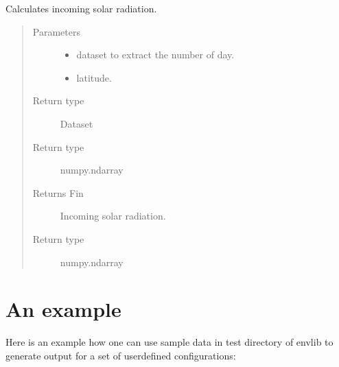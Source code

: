 \documentclass[a4paper,11pt,english]{sphinxmanual}
\begin{document}
\begin{fulllineitems}
\label{\detokenize{modules:envlib.accf.get_Fin}}
Calculates incoming solar radiation.
\begin{quote}\begin{description}
\item[{Parameters}] \leavevmode\begin{itemize}
\item {} 
 \textendash{} dataset to extract the number of day.

\item {} 
 \textendash{} latitude.

\end{itemize}

\item[{Return type}] \leavevmode
Dataset

\item[{Return type}] \leavevmode
numpy.ndarray

\item[{Returns Fin}] \leavevmode
Incoming solar radiation.

\item[{Return type}] \leavevmode
numpy.ndarray

\end{description}\end{quote}

\end{fulllineitems}



\chapter{An example}
\label{\detokenize{index:an-example}}
Here is an example how one can use sample data in test directory of envlib to generate output for a set of user\sphinxhyphen{}defined configurations:
\end{document}
